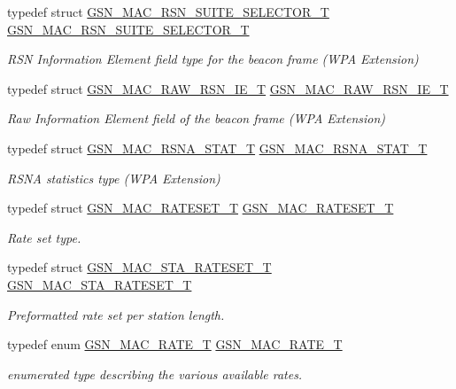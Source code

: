 \begin{DoxyCompactItemize}
typedef struct \hyperlink{a00128}{GSN\_\-MAC\_\-RSN\_\-SUITE\_\-SELECTOR\_\-T} \hyperlink{a00642_ga26429f56abe84cea3365f048adb8870f}{GSN\_\-MAC\_\-RSN\_\-SUITE\_\-SELECTOR\_\-T}
\begin{DoxyCompactList}\small\item\em RSN Information Element field type for the beacon frame (WPA Extension) \end{DoxyCompactList}\item 
typedef struct \hyperlink{a00126}{GSN\_\-MAC\_\-RAW\_\-RSN\_\-IE\_\-T} \hyperlink{a00642_ga4a6cc0e7737d1ea40ea41dc94472455f}{GSN\_\-MAC\_\-RAW\_\-RSN\_\-IE\_\-T}
\begin{DoxyCompactList}\small\item\em Raw Information Element field of the beacon frame (WPA Extension) \end{DoxyCompactList}\item 
typedef struct \hyperlink{a00129}{GSN\_\-MAC\_\-RSNA\_\-STAT\_\-T} \hyperlink{a00642_ga72bcd48cbb7fbabbe7a09a5271e1723e}{GSN\_\-MAC\_\-RSNA\_\-STAT\_\-T}
\begin{DoxyCompactList}\small\item\em RSNA statistics type (WPA Extension) \end{DoxyCompactList}\item 
typedef struct \hyperlink{a00125}{GSN\_\-MAC\_\-RATESET\_\-T} \hyperlink{a00642_ga3030fec57a589cc8daf2616c8cad3e0d}{GSN\_\-MAC\_\-RATESET\_\-T}
\begin{DoxyCompactList}\small\item\em Rate set type. \end{DoxyCompactList}\item 
typedef struct \hyperlink{a00132}{GSN\_\-MAC\_\-STA\_\-RATESET\_\-T} \hyperlink{a00642_gaaffd1c48ebeedf03ed41954311a17ec0}{GSN\_\-MAC\_\-STA\_\-RATESET\_\-T}
\begin{DoxyCompactList}\small\item\em Preformatted rate set per station length. \end{DoxyCompactList}\item 
typedef enum \hyperlink{a00642_ga260da9755b2bec5e93c8b16a5a92d41d}{GSN\_\-MAC\_\-RATE\_\-T} \hyperlink{a00642_ga514160bf923e24c122096eecb9350b16}{GSN\_\-MAC\_\-RATE\_\-T}
\begin{DoxyCompactList}\small\item\em enumerated type describing the various available rates. \end{DoxyCompactList}\item 

\end{DoxyCompactItemize}
